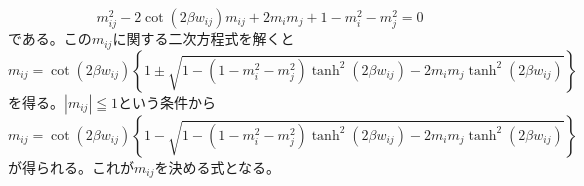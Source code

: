\begin{equation}
m_{ij}^{2}-2\cot(2\beta w_{ij})m_{ij}+2m_{i}m_{j}+1-m_{i}^2-m_{j}^{2}=0\nonumber
\end{equation}
である。この$m_{ij}$に関する二次方程式を解くと
\begin{equation}
m_{ij}=\cot(2\beta w_{ij})\left\{1\pm
\sqrt{1-(1-m_{i}^{2}-m_{j}^{2})\tanh^{2}(2\beta
w_{ij})-2m_{i}m_{j}\tanh^{2}(2\beta w_{ij})}\right\}\label{eq:4.29}
\end{equation}
を得る。$|m_{ij}|\leqq 1$という条件から
\begin{equation}
m_{ij}=\cot(2\beta w_{ij})\left\{1-
\sqrt{1-(1-m_{i}^{2}-m_{j}^{2})\tanh^{2}(2\beta
w_{ij})-2m_{i}m_{j}\tanh^{2}(2\beta w_{ij})}\right\}\label{eq:4.30}
\end{equation}
が得られる。これが$m_{ij}$を決める式となる。

